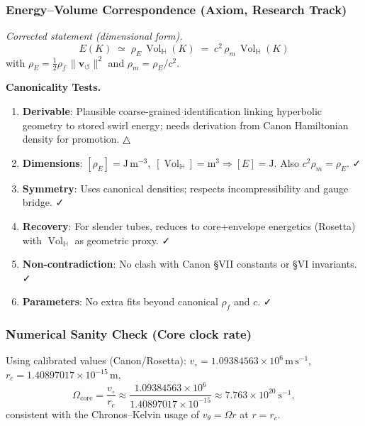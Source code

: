\documentclass[10pt,reprint,aps,onecolumn,nofootinbib]{revtex4-2}
\newcommand{\Vol}{\operatorname{Vol}}   %
\begin{document}
    \subsubsection{Energy–Volume Correspondence (Axiom, Research Track)}
    \emph{Corrected statement (dimensional form).}
    \[
        \boxed{\;E(K)\;\simeq\;\rho_{\!E}\,\Vol_{\!\mathbb{H}}(K)\;=\;c^{2}\,\rho_{\!m}\,\Vol_{\!\mathbb{H}}(K)\;}
    \]
    with $\rho_{\!E}=\tfrac12 \rho_{\!f}\,\lVert \mathbf{v}_{\!\boldsymbol{\circlearrowleft}}\rVert^{2}$ and $\rho_{\!m}=\rho_{\!E}/c^{2}$.

    \textbf{Canonicality Tests.}
    \begin{enumerate}
        \item \textbf{Derivable}: Plausible coarse-grained identification linking hyperbolic geometry to stored swirl energy; needs derivation from Canon Hamiltonian density for promotion. △
        \item \textbf{Dimensions}: $[\rho_{\!E}]=\mathrm{J\,m^{-3}},\; [\Vol_{\!\mathbb{H}}]=\mathrm{m^3}\Rightarrow [E]=\mathrm{J}$. Also $c^{2}\rho_{\!m}=\rho_{\!E}$. ✓
        \item \textbf{Symmetry}: Uses canonical densities; respects incompressibility and gauge bridge. ✓
        \item \textbf{Recovery}: For slender tubes, reduces to core+envelope energetics (Rosetta) with $\Vol_{\!\mathbb{H}}$ as geometric proxy. ✓
        \item \textbf{Non-contradiction}: No clash with Canon §VII constants or §VI invariants. ✓
        \item \textbf{Parameters}: No extra fits beyond canonical $\rho_{\!f}$ and $c$. ✓
    \end{enumerate}

    \subsubsection{Numerical Sanity Check (Core clock rate)}
    Using calibrated values (Canon/Rosetta): $v_\circ=1.09384563\times 10^{6}\,\mathrm{m\,s^{-1}}$,
    $r_c=1.40897017\times 10^{-15}\,\mathrm{m}$,
    \[
        \Omega_{\text{core}}=\frac{v_\circ}{r_c}\approx
        \frac{1.09384563\times 10^{6}}{1.40897017\times 10^{-15}}
        \approx 7.763\times 10^{20}\ \mathrm{s^{-1}},
    \]
    consistent with the Chronos–Kelvin usage of $v_\theta=\Omega r$ at $r=r_c$.
\end{document}
